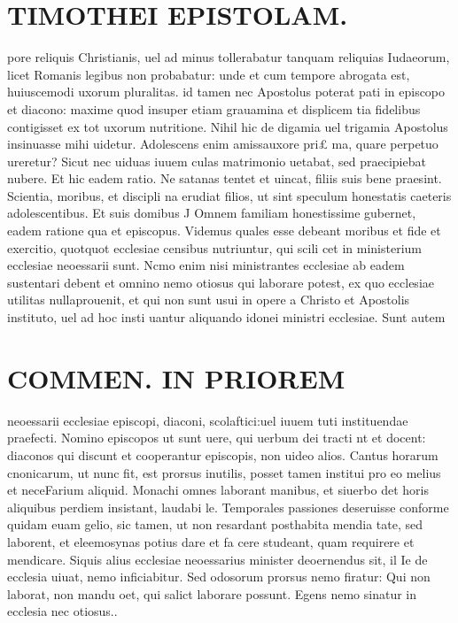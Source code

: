 \documentclass{article}
\begin{document}
\begin{pages}
\section*{TIMOTHEI EPISTOLAM. }
\marginpar{[ p.85 ]}\pstart pore reliquis Christianis, uel ad minus tollerabatur tanquam reliquias Iudaeorum, licet Romanis legibus non probabatur: unde et cum tempore abrogata est, huiuscemodi uxorum pluralitas. id tamen nec Apostolus poterat pati in episcopo et diacono: maxime quod insuper etiam grauamina et displicem tia fidelibus contigisset ex tot uxorum nutritione. Nihil hic de digamia uel trigamia Apostolus insinuasse mihi uidetur. Adolescens enim amissauxore pri£ ma, quare perpetuo ureretur? Sicut nec uiduas iuuem culas matrimonio uetabat, sed praecipiebat nubere. Et hic eadem ratio. Ne satanas tentet et uincat, filiis suis bene praesint. Scientia, moribus, et discipli na erudiat filios, ut sint speculum honestatis caeteris adolescentibus.  \pend\pstart Et suis domibus J Omnem familiam honestissime gubernet, eadem ratione qua et episcopus. Videmus quales esse debeant moribus et fide et exercitio, quotquot ecclesiae censibus nutriuntur, qui scili cet in ministerium ecclesiae neoessarii sunt. Ncmo enim nisi ministrantes ecclesiae ab eadem sustentari debent et omnino nemo otiosus qui laborare potest, ex quo ecclesiae utilitas nullaprouenit, et qui non sunt usui in opere a Christo et Apostolis instituto, uel ad hoc insti uantur aliquando idonei ministri ecclesiae. Sunt autem  \pend
\section*{COMMEN. IN PRIOREM }
\marginpar{[ p.86 ]}\pstart neoessarii ecclesiae episcopi, diaconi, scolaftici:uel iuuem tuti instituendae praefecti. Nomino episcopos ut sunt uere, qui uerbum dei tracti nt et docent: diaconos qui discunt et cooperantur episcopis, non uideo alios. Cantus horarum cnonicarum, ut nunc fit, est prorsus inutilis, posset tamen institui pro eo melius et neceFarium aliquid. Monachi omnes laborant manibus, et siuerbo det horis aliquibus perdiem insistant, laudabi le. Temporales passiones deseruisse conforme quidam euam gelio, sic tamen, ut non resardant posthabita mendia tate, sed laborent, et eleemosynas potius dare et fa cere studeant, quam requirere et mendicare. Siquis alius ecclesiae neoessarius minister deoernendus sit, il Ie de ecclesia uiuat, nemo inficiabitur. Sed odosorum prorsus nemo firatur: Qui non laborat, non mandu oet, qui salict laborare possunt. Egens nemo sinatur in ecclesia nec otiosus..  \pend
{}
{}

\end{pages}
\end{document}
